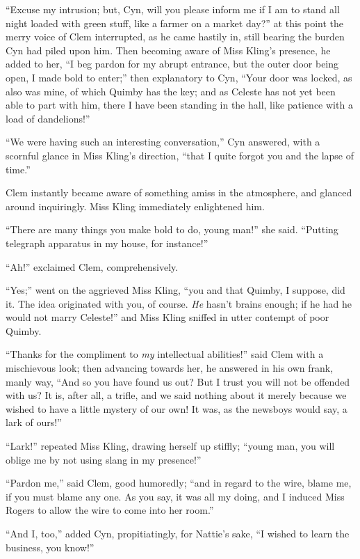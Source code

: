 ``Excuse my intrusion; but, Cyn, will you please inform me if I am to
stand all night loaded with green stuff, like a farmer on a market day?''
at this point the merry voice of Clem interrupted, as he came hastily
in, still bearing the burden Cyn had piled upon him. Then becoming aware
of Miss Kling's presence, he added to her, ``I beg pardon for my abrupt
entrance, but the outer door being open, I made bold to enter;'' then
explanatory to Cyn, ``Your door was locked, as also was mine, of which
Quimby has the key; and as Celeste has not yet been able to part with
him, there I have been standing in the hall, like patience with a load
of dandelions!''

``We were having such an interesting conversation,'' Cyn answered, with a
scornful glance in Miss Kling's direction, ``that I quite forgot you and
the lapse of time.''

Clem instantly became aware of something amiss in the atmosphere, and
glanced around inquiringly. Miss Kling immediately enlightened him.

``There are many things you make bold to do, young man!'' she said.
``Putting telegraph apparatus in my house, for instance!''

``Ah!'' exclaimed Clem, comprehensively.

``Yes;'' went on the aggrieved Miss Kling, ``you and that Quimby, I
suppose, did it. The idea originated with you, of course. \emph{He} hasn't
brains enough; if he had he would not marry Celeste!'' and Miss Kling
sniffed in utter contempt of poor Quimby.

``Thanks for the compliment to \emph{my} intellectual abilities!'' said Clem with
a mischievous look; then advancing towards her, he answered in his own
frank, manly way, ``And so you have found us out? But I trust you will
not be offended with us? It is, after all, a trifle, and we said nothing
about it merely because we wished to have a little mystery of our own!
It was, as the newsboys would say, a lark of ours!''

``Lark!'' repeated Miss Kling, drawing herself up stiffly; ``young man, you
will oblige me by not using slang in my presence!''

``Pardon me,'' said Clem, good humoredly; ``and in regard to the wire,
blame me, if you must blame any one. As you say, it was all my doing,
and I induced Miss Rogers to allow the wire to come into her room.''

``And I, too,'' added Cyn, propitiatingly, for Nattie's sake, ``I wished to
learn the business, you know!''

